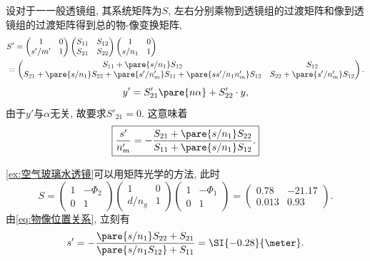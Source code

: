 \documentclass{ctexart}
\begin{document}
设对于一一般透镜组, 其系统矩阵为$S$, 左右分别乘物到透镜组的过渡矩阵和像到透镜组的过渡矩阵得到总的物-像变换矩阵,
\begin{align*}
&S'= \begin{pmatrix}
    1 & 0 \\
    s'/m' & 1
\end{pmatrix}\begin{pmatrix}
    S_{11} & S_{12} \\
    S_{21} & S_{22}
\end{pmatrix}\begin{pmatrix}
    1 & 0 \\
    s/n_1 & 1 
\end{pmatrix}\\ &= \begin{pmatrix}
    S_{11} + \pare{s/n_1}S_{12} & S_{12} \\
    S_{21} + \pare{s/n_1}S_{22} + \pare{s'/n'_m}S_{11} + \pare{ss'/n_1n'_m}S_{12} & S_{22} + \pare{s'/n'_m}S_{12}
\end{pmatrix}.
\end{align*}
\[ y' = S'_{21}\pare{n\alpha} + S'_{22}\cdot y, \]
由于$y'$与$\alpha$无关, 故要求$S'_{21} = 0$. 这意味着
\begin{equation}
    \label{eq:物像位置关系}
    \boxed{\frac{s'}{n'_m} = -\frac{S_{21} + \pare{s/n_1}S_{22}}{S_{11}+\pare{s/n_1}S_{12}}.} 
\end{equation}
\begin{sample}
    \begin{ex}
        \cref{ex:空气玻璃水透镜}可以用矩阵光学的方法, 此时
        \begin{equation*}
        S = \begin{pmatrix}
            1 & -\Phi_2 \\
            0 & 1
        \end{pmatrix}\begin{pmatrix}
            1 & 0 \\
            d/n_g & 1
        \end{pmatrix}\begin{pmatrix}
            1 & -\Phi_1 \\
            0 & 1
        \end{pmatrix}
        = \begin{pmatrix}
            0.78 & -21.17 \\
            0.013 & 0.93
        \end{pmatrix}.
        \end{equation*}
        由\eqref{eq:物像位置关系}, 立刻有
        \[ s' = -\frac{\pare{s/n_1}S_{22}+S_{21}}{\pare{s/n_1S_{12}}+S_{11}} = \SI{-0.28}{\meter}. \]
    \end{ex}
\end{sample}
\end{document}
